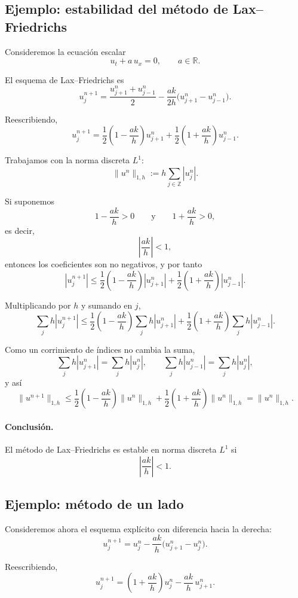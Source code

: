 \subsection{Ejemplo: estabilidad del método de Lax--Friedrichs}

Consideremos la ecuación escalar
\[
u_t+a\,u_x=0,
\qquad a\in\mathbb{R}.
\]

El esquema de Lax--Friedrichs es
\[
u_j^{n+1}
=
\frac{u_{j+1}^n+u_{j-1}^n}{2}
-
\frac{ak}{2h}\bigl(u_{j+1}^n-u_{j-1}^n\bigr).
\]

Reescribiendo,
\[
u_j^{n+1}
=
\frac12\left(1-\frac{ak}{h}\right)u_{j+1}^n
+
\frac12\left(1+\frac{ak}{h}\right)u_{j-1}^n.
\]

Trabajamos con la norma discreta \(L^1\):
\[
\|u^n\|_{1,h}:=h\sum_{j\in\mathbb{Z}}|u_j^n|.
\]

Si suponemos
\[
1-\frac{ak}{h}>0
\qquad \text{y} \qquad
1+\frac{ak}{h}>0,
\]
es decir,
\[
\left|\frac{ak}{h}\right|<1,
\]
entonces los coeficientes son no negativos, y por tanto
\[
|u_j^{n+1}|
\le
\frac12\left(1-\frac{ak}{h}\right)|u_{j+1}^n|
+
\frac12\left(1+\frac{ak}{h}\right)|u_{j-1}^n|.
\]

Multiplicando por \(h\) y sumando en \(j\),
\[
\sum_j h|u_j^{n+1}|
\le
\frac12\left(1-\frac{ak}{h}\right)\sum_j h|u_{j+1}^n|
+
\frac12\left(1+\frac{ak}{h}\right)\sum_j h|u_{j-1}^n|.
\]

Como un corrimiento de índices no cambia la suma,
\[
\sum_j h|u_{j+1}^n|=\sum_j h|u_j^n|,
\qquad
\sum_j h|u_{j-1}^n|=\sum_j h|u_j^n|,
\]
y así
\[
\|u^{n+1}\|_{1,h}
\le
\frac12\left(1-\frac{ak}{h}\right)\|u^n\|_{1,h}
+
\frac12\left(1+\frac{ak}{h}\right)\|u^n\|_{1,h}
=
\|u^n\|_{1,h}.
\]

\paragraph{Conclusión.}
El método de Lax--Friedrichs es estable en norma discreta \(L^1\) si
\[
\boxed{\left|\frac{ak}{h}\right|<1.}
\]

\subsection{Ejemplo: método de un lado}

Consideremos ahora el esquema explícito con diferencia hacia la derecha:
\[
u_j^{n+1}
=
u_j^n-\frac{ak}{h}\bigl(u_{j+1}^n-u_j^n\bigr).
\]

Reescribiendo,
\[
u_j^{n+1}
=
\left(1+\frac{ak}{h}\right)u_j^n
-
\frac{ak}{h}\,u_{j+1}^n.
\]

